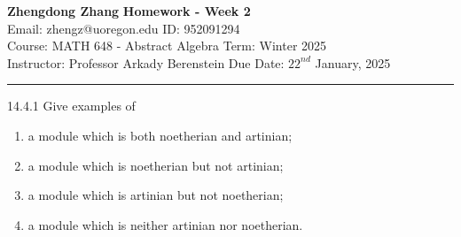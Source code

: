 \documentclass[a4paper, 12pt]{article}
\begin{document}
\noindent
\large\textbf{Zhengdong Zhang} \hfill \textbf{Homework - Week 2}   \\
Email: zhengz@uoregon.edu \hfill ID: 952091294 \\
\normalsize Course: MATH 648 - Abstract Algebra  \hfill Term: Winter 2025\\
Instructor: Professor Arkady Berenstein \hfill Due Date: $22^{nd}$ January, 2025 \\
\noindent\rule{7in}{2.8pt}
\begin{problem}{14.4.1}
Give examples of 
\begin{enumerate}[(1)]
\item a module which is both noetherian and artinian;
\item a module which is noetherian but not artinian;
\item a module which is artinian but not noetherian;
\item a module which is neither artinian nor noetherian.
\end{enumerate}
\end{problem}
\end{document}
